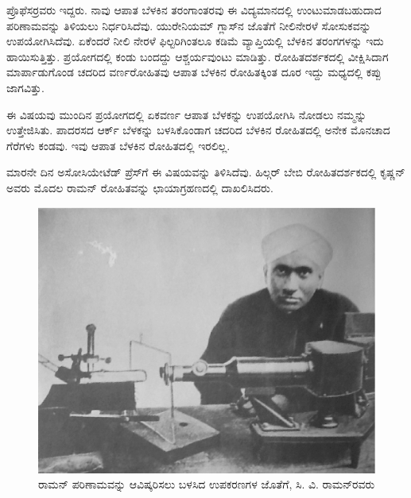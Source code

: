 ಪ್ರೊಫೆಸರ್‍ರವರು ಇದ್ದರು. ನಾವು ಆಪಾತ ಬೆಳಕಿನ ತರಂಗಾಂತರವು ಈ ವಿದ್ಯಮಾನದಲ್ಲಿ ಉಂಟುಮಾಡಬಹುದಾದ ಪರಿಣಾಮವನ್ನು ತಿಳಿಯಲು ನಿರ್ಧರಿಸಿದೆವು. ಯುರೇನಿಯಮ್ ಗ್ಲಾಸ್‍ನ ಜೊತೆಗೆ ನೀಲಿ\enginline{-}ನೇರಳೆ ಸೋಸುಕವನ್ನು ಉಪಯೋಗಿಸಿದೆವು. ಏಕೆಂದರೆ ನೀಲಿ ನೇರಳೆ ಫಿಲ್ಟರಿಗಿಂತಲೂ ಕಡಿಮೆ ವ್ಯಾಪ್ತಿಯಲ್ಲಿ ಬೆಳಕಿನ ತರಂಗಗಳನ್ನು ಇದು ಹಾಯಿಸುತ್ತಿತ್ತು. ಪ್ರಯೋಗದಲ್ಲಿ ಕಂಡು ಬಂದದ್ದು ಆಶ್ಚರ್ಯವುಂಟು ಮಾಡಿತ್ತು. ರೋಹಿತದರ್ಶಕದಲ್ಲಿ ವೀಕ್ಷಿಸಿದಾಗ ಮಾರ್ಪಾಡುಗೊಂಡ ಚದರಿದ ವರ್ಣರೋಹಿತವು ಆಪಾತ ಬೆಳಕಿನ ರೋಹಿತಕ್ಕಿಂತ ದೂರ ಇದ್ದು ಮಧ್ಯದಲ್ಲಿ ಕಪ್ಪು ಜಾಗವಿತ್ತು.

ಈ ವಿಷಯವು ಮುಂದಿನ ಪ್ರಯೋಗದಲ್ಲಿ ಏಕವರ್ಣ ಆಪಾತ ಬೆಳಕನ್ನು ಉಪಯೋಗಿಸಿ ನೋಡಲು ನಮ್ಮನ್ನು ಉತ್ತೇಜಿಸಿತು. ಪಾದರಸದ ಆರ್ಕ್ ಬೆಳಕನ್ನು ಬಳಸಿಕೊಂಡಾಗ ಚದರಿದ ಬೆಳಕಿನ ರೋಹಿತದಲ್ಲಿ ಅನೇಕ ಮೊನಚಾದ ಗೆರೆಗಳು ಕಂಡವು. ಇವು ಆಪಾತ ಬೆಳಕಿನ ರೋಹಿತದಲ್ಲಿ ಇರಲಿಲ್ಲ.

ಮಾರನೇ ದಿನ ಅಸೋಸಿಯೇಟೆಡ್ ಪ್ರೆಸ್‍ಗೆ ಈ ವಿಷಯವನ್ನು ತಿಳಿಸಿದೆವು. ಹಿಲ್ಗರ್ ಬೇಬಿ ರೋಹಿತದರ್ಶಕದಲ್ಲಿ ಕೃಷ್ಣನ್ ಅವರು ಮೊದಲ ರಾಮನ್ ರೋಹಿತವನ್ನು ಛಾಯಾಗ್ರಹಣದಲ್ಲಿ ದಾಖಲಿಸಿದರು.

\begin{figure}[!htbp]
\includegraphics[scale=0.83]{"images/1.jpg"}
\caption{ರಾಮನ್ ಪರಿಣಾಮವನ್ನು ಆವಿಷ್ಕರಿಸಲು ಬಳಸಿದ ಉಪಕರಣಗಳ ಜೊತೆಗೆ, ಸಿ. ವಿ. ರಾಮನ್‍ರವರು}\label{chap1-fig01}
\end{figure}


